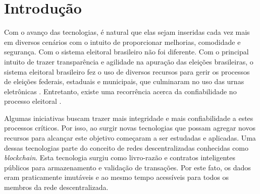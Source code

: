 \documentclass[portuguese]{textolivre}
\begin{document}
\begin{polyabstract}
\begin{english}
\begin{abstract}
				
				
				
				
			\end{abstract}
		\end{english}
		
		
	\end{polyabstract}
	
	
	\section{Introdução}\label{Introdução}
	
	Com o avanço das tecnologias, é natural que elas sejam inseridas cada vez mais em diversos cenários com o intuito de proporcionar melhorias, comodidade e segurança. Com o sistema eleitoral brasileiro não foi diferente. Com o principal intuito de trazer transparência e agilidade na apuração das eleições brasileiras, o sistema eleitoral brasileiro fez o uso de diversos recursos para gerir os processos de eleições federais, estaduais e municipais, que culminaram no uso das urnas eletrônicas \cite{sepulvida2019estudo}. Entretanto, existe uma recorrência acerca da confiabilidade no processo eleitoral \cite{machado2021vulnerabilidade}. 
	
	
	Algumas iniciativas buscam trazer mais integridade e mais confiabilidade a estes processos críticos. Por isso, ao surgir novas tecnologias que possam agregar novos recursos para alcançar este objetivo começaram a ser estudadas e aplicadas. Uma dessas tecnologias parte do conceito de redes descentralizadas conhecidas como \textit{blockchain}. Esta tecnologia surgiu como livro-razão e contratos inteligentes públicos para armazenamento e validação de transações. Por este fato, os dados eram praticamente imutáveis e ao mesmo tempo acessíveis para todos os membros da rede descentralizada.
	
\end{document}
